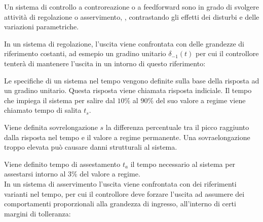 \documentclass{article}
\numberwithin{equation}{subsection}
\begin{document}
Un sistema di controllo a controreazione o a feedforward sono in grado di svolgere attività di regolazione o asservimento, , contrastando gli effetti dei disturbi e 
delle variazioni parametriche. 


In un sistema di regolazione, l'uscita viene confrontata con delle grandezze di riferimento costanti, ad esmepio un gradino unitario $\delta_{-1}(t)$ per cui il controllore 
tenterà di mantenere l'uscita in un intorno di questo riferimento:

\begin{center}
\end{center}

Le specifiche di un sistema nel tempo vengono definite sulla base della risposta ad un gradino unitario. Questa risposta viene chiamata risposta indiciale. Il tempo 
che impiega il sistema per salire dal $10\%$ al $90\%$ del suo valore a regime viene chiamato tempo di salita $t_s$. 

Viene definita sovrelongazione $s$ la differenza percentuale tra il picco raggiunto dalla risposta nel tempo e il valore a regime permanente. Una sovraelongazione troppo 
elevata può causare danni strutturali al sistema. 

Viene definito tempo di assestamento $t_a$ il tempo necessario al sistema per assestarsi intorno al $3\%$ del valore a regime. 
\\
In un sistema di asservimento l'uscita viene confrontata con dei riferimenti varianti nel tempo, per cui il controllore deve forzare l'uscita ad assumere dei comportamenti 
proporzionali alla grandezza di ingresso, all'interno di certi margini di tolleranza: 

\begin{center}
\end{center}
\end{document}
